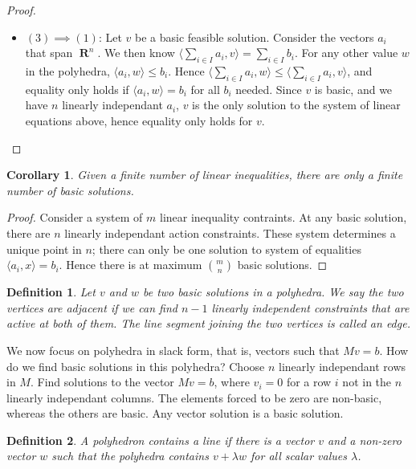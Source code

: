 \documentclass{report}
\DeclareMathOperator{\real}{\mathbf{R}}
\newtheorem{definition}{Definition}
\newtheorem{corollary}{Corollary}[theorem]
\begin{document}
\begin{proof}
\begin{itemize}
            \item $(3) \implies (1)$: Let $v$ be a basic feasible solution. Consider the vectors $a_i$ that span $\real^n$. We then know $\langle \sum_{i \in I} a_i, v \rangle = \sum_{i \in I} b_i$. For any other value $w$ in the polyhedra, $\langle a_i, w \rangle \leq b_i$. Hence $\langle \sum_{i \in I} a_i, w \rangle \leq \langle \sum_{i \in I} a_i , v \rangle$, and equality only holds if $\langle a_i, w \rangle = b_i$ for all $b_i$ needed. Since $v$ is basic, and we have $n$ linearly independant $a_i$, $v$ is the only solution to the system of linear equations above, hence equality only holds for $v$.
        \end{itemize}
    \end{proof}

    \begin{corollary}
        Given a finite number of linear inequalities, there are only a finite number of basic solutions.
    \end{corollary}
    \begin{proof}
        Consider a system of $m$ linear inequality contraints. At any basic solution, there are $n$ linearly independant action constraints. These system determines a unique point in $n$; there can only be one solution to system of equalities $\langle a_i, x \rangle = b_i$. Hence there is at maximum $\binom{m}{n}$ basic solutions.
    \end{proof}

    \begin{definition}
        Let $v$ and $w$ be two basic solutions in a polyhedra. We say the two vertices are adjacent if we can find $n-1$ linearly independent constraints that are active at both of them. The line segment joining the two vertices is called an edge.
    \end{definition}

    We now focus on polyhedra in slack form, that is, vectors such that $Mv = b$. How do we find basic solutions in this polyhedra? Choose $n$ linearly independant rows in $M$. Find solutions to the vector $Mv = b$, where $v_i = 0$ for a row $i$ not in the $n$ linearly independant columns. The elements forced to be zero are non-basic, whereas the others are basic. Any vector solution is a basic solution.

    \begin{definition}
        A polyhedron contains a line if there is a vector $v$ and a non-zero vector $w$ such that the polyhedra contains $v + \lambda w$ for all scalar values $\lambda$.
    \end{definition}
\end{document}
